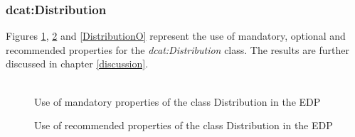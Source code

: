 \documentclass[<options>]{elsarticle}
\begin{document}
\subsubsection{dcat:Distribution}
Figures \ref{DistributionM}, \ref{DistributionR} and \ref{DistributionO} represent the use of mandatory, optional and recommended properties for the \textit{dcat:Distribution} class. The results are further discussed in chapter \ref{discussion}.
\\
\\
\begin{figure}[H]
\caption{Use of mandatory properties of the class Distribution in the EDP}\label{DistributionM}
\end{figure}
\begin{figure}[H]
\caption{Use of recommended properties of the class Distribution in the EDP}\label{DistributionR}
\end{figure}
\end{document}

